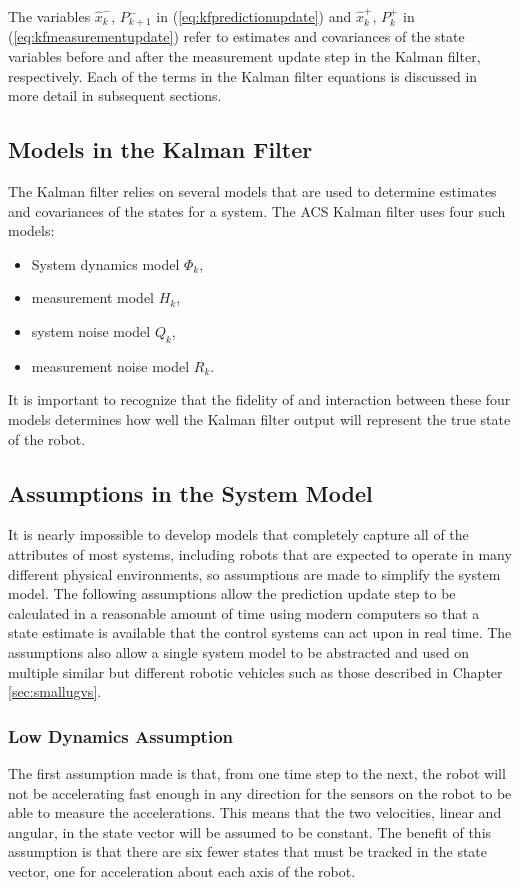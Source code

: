 The variables $\hat{x}_k^-$, $P_{k+1}^-$ in (\ref{eq:kfpredictionupdate}) and $\hat{x}_k^+$, $P_{k}^+$ in (\ref{eq:kfmeasurementupdate}) refer to estimates and covariances of the state variables before and after the measurement update step in the Kalman filter, respectively. Each of the terms in the Kalman filter equations is discussed in more detail in subsequent sections.

\subsection{Models in the Kalman Filter}
\label{sec:kfModels}
The Kalman filter relies on several models that are used to determine estimates and covariances of the states for a system. The ACS Kalman filter uses four such models:
\begin{itemize}
\item System dynamics model $\Phi_k$,
\item measurement model $H_k$,
\item system noise model $Q_k$,
\item measurement noise model $R_k$.
\end{itemize}

It is important to recognize that the fidelity of and interaction between these four models determines how well the Kalman filter output will represent the true state of the robot.

\subsection{Assumptions in the System Model}
\label{sec:kfAssumptions}
It is nearly impossible to develop models that completely capture all of the attributes of most systems, including robots that are expected to operate in many different physical environments, so assumptions are made to simplify the system model. The following assumptions allow the prediction update step to be calculated in a reasonable amount of time using modern computers so that a state estimate is available that the control systems can act upon in real time. The assumptions also allow a single system model to be abstracted and used on multiple similar but different robotic vehicles such as those described in Chapter \ref{sec:smallugvs}.

\subsubsection{Low Dynamics Assumption}
\label{sec:kfLowDynamicsAssumption}
The first assumption made is that, from one time step to the next, the robot will not be accelerating fast enough in any direction for the sensors on the robot to be able to measure the accelerations. This means that the two velocities, linear and angular, in the state vector will be assumed to be constant. The benefit of this assumption is that there are six fewer states that must be tracked in the state vector, one for acceleration about each axis of the robot.

